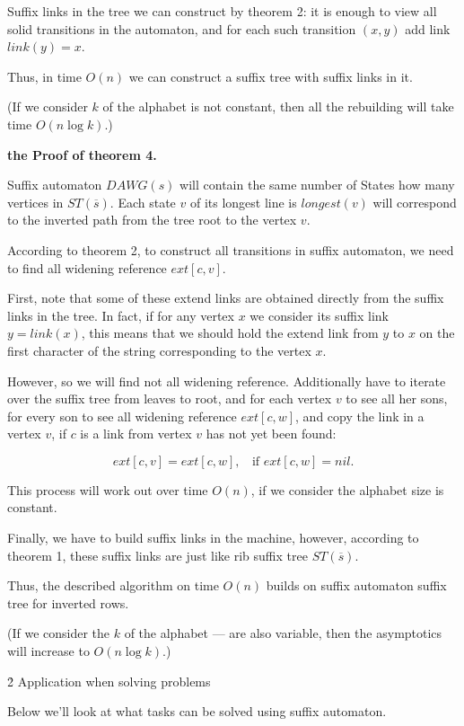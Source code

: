 Suffix links in the tree we can construct by theorem 2: it is enough to view all solid transitions in the automaton, and for each such transition $(x,y)$ add link $link(y) = x$.

Thus, in time $O(n)$ we can construct a suffix tree with suffix links in it.

(If we consider $k$ of the alphabet is not constant, then all the rebuilding will take time $O (n \log k)$.)

\bf{the Proof of theorem 4}.

Suffix automaton $DAWG(s)$ will contain the same number of States how many vertices in $ST(\overline{s})$. Each state $v$ of its longest line is $longest(v)$ will correspond to the inverted path from the tree root to the vertex $v$.

According to theorem 2, to construct all transitions in suffix automaton, we need to find all widening reference $ext[c,v]$.

First, note that some of these extend links are obtained directly from the suffix links in the tree. In fact, if for any vertex $x$ we consider its suffix link $y = link(x)$, this means that we should hold the extend link from $y$ to $x$ on the first character of the string corresponding to the vertex $x$.

However, so we will find not all widening reference. Additionally have to iterate over the suffix tree from leaves to root, and for each vertex $v$ to see all her sons, for every son to see all widening reference $ext[c,w]$, and copy the link in a vertex $v$, if $c$ is a link from vertex $v$ has not yet been found:

$$ ext[c,v] = ext[c,w], ~~~~ \text{if $ext[c,w] = nil$.} $$

This process will work out over time $O (n)$, if we consider the alphabet size is constant.

Finally, we have to build suffix links in the machine, however, according to theorem 1, these suffix links are just like rib suffix tree $ST(\overline{s})$.

Thus, the described algorithm on time $O(n)$ builds on suffix automaton suffix tree for inverted rows.

(If we consider the $k$ of the alphabet --- are also variable, then the asymptotics will increase to $O (n \log k)$.)



\h2{ Application when solving problems }

Below we'll look at what tasks can be solved using suffix automaton.

